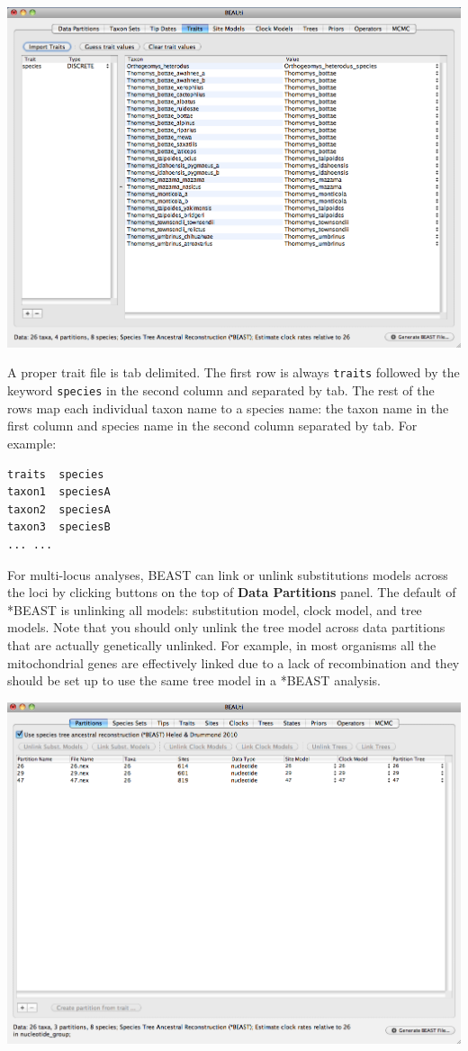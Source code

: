 \documentclass[12pt]{article}
\begin{document}
\includegraphics[scale=0.4]{figures/BEAUti_Trait}

\medskip{}

A proper trait file is tab delimited. The first row is always \texttt{traits} followed by the keyword \texttt{species} in the second column and separated by tab. The rest of the rows map each individual taxon name to a species name: the taxon name in the first column and species name in the second column separated by tab. For example:

\begin{verbatim}
traits	species
taxon1	speciesA
taxon2	speciesA
taxon3	speciesB
... ...
\end{verbatim}

For multi-locus analyses, BEAST can link or unlink substitutions models across the loci by clicking buttons on the top of {\bf Data Partitions} panel. The default of *BEAST is unlinking all models: substitution model, clock model, and tree models. Note that you should only unlink the tree model across data partitions that are actually genetically unlinked. For example, in most organisms all the mitochondrial genes are effectively linked due to a lack of recombination and they should be set up to use the same tree model in a *BEAST analysis. 

\medskip{}

\includegraphics[scale=0.4]{figures/BEAUti_DataPartitions2}
\end{document}
